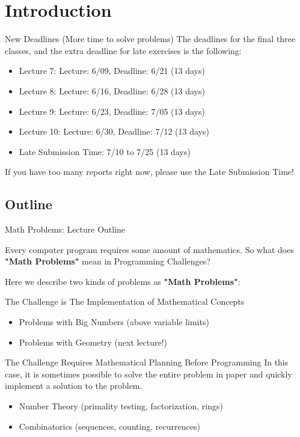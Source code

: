 \section{Introduction}

\begin{frame}{New Deadlines (More time to solve problems)}
  The deadlines for the final three classes, and the extra deadline for late exercises is the following:\bigskip

  \begin{itemize}
    \item Lecture 7: Lecture: 6/09, Deadline: 6/21 (13 days)
    \item Lecture 8: Lecture: 6/16, Deadline: 6/28 (13 days)
    \item Lecture 9: Lecture: 6/23, Deadline: 7/05 (13 days)
    \item Lecture 10: Lecture: 6/30, Deadline: 7/12 (13 days)
    \item Late Submission Time: 7/10 to 7/25 (13 days)
  \end{itemize}\bigskip

  If you have too many reports right now, please use the Late Submission Time!
\end{frame}

\subsection{Outline}
\begin{frame}{Math Problems: Lecture Outline}

  Every computer program requires some amount of mathematics. So what does {\bf "Math Problems"} mean in Programming Challenges?\bigskip

  Here we describe two kinds of problems as {\bf "Math Problems"}:

  \begin{block}{The Challenge is The Implementation of Mathematical Concepts}
    \begin{itemize}
      \item Problems with Big Numbers (above variable limits)
      \item Problems with Geometry (next lecture!)
    \end{itemize}
  \end{block}
  \begin{exampleblock}{The Challenge Requires Mathematical Planning Before Programming}
    In this case, it is sometimes possible to solve the entire problem in paper and quickly implement a solution to the problem.
    \begin{itemize}
      \item Number Theory (primality testing, factorization, rings)
      \item Combinatorics (sequences, counting, recurrences)
    \end{itemize}
  \end{exampleblock}
\end{frame}
